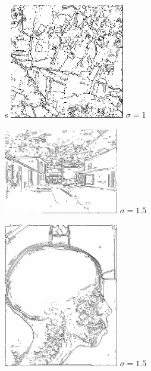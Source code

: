 \documentclass[a4,12pt]{article}
\begin{document}
\begin{center}
	\begin{minipage}[c]{0.30\linewidth}
		\begin{center}
s			\includegraphics[width = 50mm]{./img/ctraquitain-1.jpg}
			\textit{$\sigma = 1$}\\
		\end{center}
	\end{minipage}
	\begin{minipage}[c]{0.30\linewidth}
		\begin{center}
			\includegraphics[width = 50mm]{./img/ctrcouchersoleil-1_5.jpg}
			\textit{$\sigma = 1.5$}\\
		\end{center}
	\end{minipage}
	\begin{minipage}[c]{0.30\linewidth}
		\begin{center}
			\includegraphics[width = 50mm]{./img/ctrradio-1_5.jpg}
			\textit{$\sigma = 1.5$}\\
		\end{center}
	\end{minipage}
\end{center}
\end{document}
